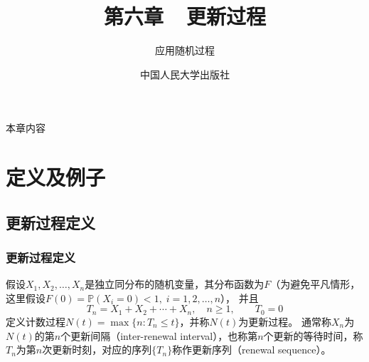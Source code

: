 \documentclass[t]{beamer}
\renewcommand{\Pr}{\mathbb{P}}
\begin{document}
\fontsize{11}{18}\selectfont


\CTEXindent



  \title{第六章~~更新过程}
\author{应用随机过程}
\date{中国人民大学出版社}
  \begin{frame}
    \maketitle
  \end{frame}

\begin{frame}{本章内容}
\begin{multicols}{2}
  \tableofcontents
\end{multicols}
\end{frame}


  \section{定义及例子}

  \subsection{更新过程定义}

\begin{frame}
  \frametitle{更新过程定义}
  假设$X_1,X_2,\ldots,X_n$是独立同分布的随机变量，其分布函数为$F$（为避免平凡情形，这里假设$F(0)=\Pr(X_i=0)<1,\; i=1,2,\ldots,n$），
  并且
  $$T_n=X_1+X_2+\cdots+X_n,\quad n\ge 1,\qquad T_0=0$$
  定义计数过程$N(t)=\max\{n:T_n\le t\}$，并称$N(t)$为更新过程。
  通常称$X_n$为$N(t)$的第$n$个更新间隔（inter-renewal interval），也称第$n$个更新的等待时间，称$T_n$为第$n$次更新时刻，对应的序列$\{T_n\}$称作更新序列（renewal sequence）。
  

\end{frame}
\end{document}
